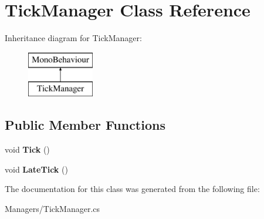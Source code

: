 \hypertarget{class_tick_manager}{}\section{Tick\+Manager Class Reference}
\label{class_tick_manager}
Inheritance diagram for Tick\+Manager\+:\begin{figure}[H]
\begin{center}
\leavevmode
\includegraphics[height=2.000000cm]{class_tick_manager}
\end{center}
\end{figure}
\subsection*{Public Member Functions}
\begin{DoxyCompactItemize}
\item 
\mbox{\label{class_tick_manager_ac7163bde3b69445f8c5d050fc1961f03}} 
void {\bfseries Tick} ()
\item 
\mbox{\label{class_tick_manager_a18659a575c6b675da3d3ae5954180121}} 
void {\bfseries Late\+Tick} ()
\end{DoxyCompactItemize}


The documentation for this class was generated from the following file\+:\begin{DoxyCompactItemize}
\item 
Managers/Tick\+Manager.\+cs\end{DoxyCompactItemize}
